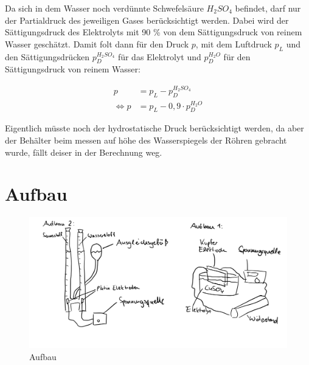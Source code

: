 Da sich in dem Wasser noch verdünnte Schwefelsäure $H_2SO_4$ befindet, darf nur der
Partialdruck des jeweiligen Gases berücksichtigt werden. Dabei wird der Sättigungsdruck des Elektrolyts
mit 90 \% von dem Sättigungsdruck von reinem Wasser geschätzt.
Damit folt dann für den Druck $p$, mit dem Luftdruck $p_L$ und den Sättigungsdrücken
$p_D^{H_2SO_4}$ für das Elektrolyt und $p_D^{H_2O}$ für den Sättigungsdruck von reinem Wasser:

\begin{align}
    p &= p_L - p_D^{H_2SO_4}\\
    \Leftrightarrow p &= p_L - 0,9 \cdot p_D^{H_2O}
    \label{eq:p}
\end{align}

Eigentlich müsste noch der hydrostatische Druck berücksichtigt werden, da aber der Behälter beim messen auf höhe des Wasserspiegels der Röhren gebracht wurde, fällt deiser in der Berechnung weg.
\newpage
\section{Aufbau}
\begin{figure}[h!]
    \centering
    \includegraphics[width = .8\textwidth]{Aufbau.jpeg}
    \caption{Aufbau}
\end{figure}
\clearpage
\newpage
